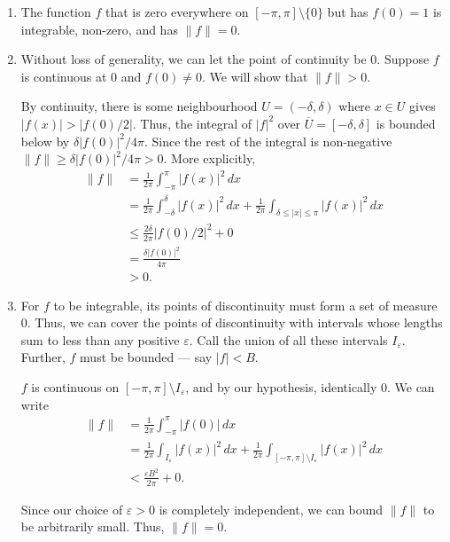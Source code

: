 \documentclass[12 pt, letterpaper]{hmcpset}
\begin{document}
\begin{solution}
	\begin{enumerate}
		\item The function $f$ that is zero everywhere on $[-\pi, \pi] \setminus \{ 0 \}$ but has $f(0) = 1$ is integrable, non-zero, and has $\lVert f \rVert = 0$.
		\item Without loss of generality, we can let the point of continuity be $0$. Suppose $f$ is continuous at $0$ and $f(0) \neq 0$. We will show that $\lVert f \rVert > 0$. 

			By continuity, there is some neighbourhood $U = (- \delta, \delta)$ where $x \in U$ gives $\lvert f(x) \rvert > \lvert f(0) / 2 \rvert$. Thus, the integral of $\lvert f \rvert^{2}$ over $\overline{U} = [-\delta, \delta]$ is bounded below by $\delta \lvert f(0) \rvert^{2} / 4 \pi$. Since the rest of the integral is non-negative $\lVert f \rVert \ge \delta \lvert f(0) \rvert^{2} / 4 \pi > 0$. More explicitly,
			\begin{align*}
				\lVert f \rVert & = \frac{1}{2 \pi} \int_{-\pi}^{\pi} \lvert f(x) \rvert^{2} \, dx \\
						& = \frac{1}{2 \pi} \int_{-\delta}^{\delta} \lvert f(x) \rvert^{2} \, dx + \frac{1}{2 \pi} \int_{\delta \le \lvert x \rvert \le \pi} \lvert f(x) \rvert^{2} \, dx \\
						& \le \frac{2 \delta}{2 \pi} \lvert f(0) / 2 \rvert^{2} + 0 \\
						& = \frac{\delta \lvert f(0) \rvert^{2}}{4 \pi} \\
						& > 0.
			\end{align*}
		\item For $f$ to be integrable, its points of discontinuity must form a set of measure $0$. Thus, we can cover the points of discontinuity with intervals whose lengths sum to less than any positive $\varepsilon$. Call the union of all these intervals $I_{\varepsilon}$. Further, $f$ must be bounded --- say $\lvert f \rvert < B$.

			$f$ is continuous on $[-\pi, \pi] \setminus I_{\varepsilon}$, and by our hypothesis, identically $0$. We can write
			\begin{align*}
				\lVert f \rVert & = \frac{1}{2 \pi} \int_{-\pi}^{\pi} \lvert f(0) \rvert \, dx \\
						& = \frac{1}{2 \pi} \int_{I_{\varepsilon}} \lvert f(x) \rvert^{2} \, dx + \frac{1}{2 \pi} \int_{[-\pi, \pi] \setminus I_{\varepsilon}} \lvert f(x) \rvert^{2} \, dx \\
						& < \frac{\varepsilon B^{2}}{2 \pi} + 0.
			\end{align*}

			Since our choice of $\varepsilon > 0$ is completely independent, we can bound $\lVert f \rVert$ to be arbitrarily small. Thus, $\lVert f \rVert = 0$.
	\end{enumerate}
\end{solution}
\end{document}
